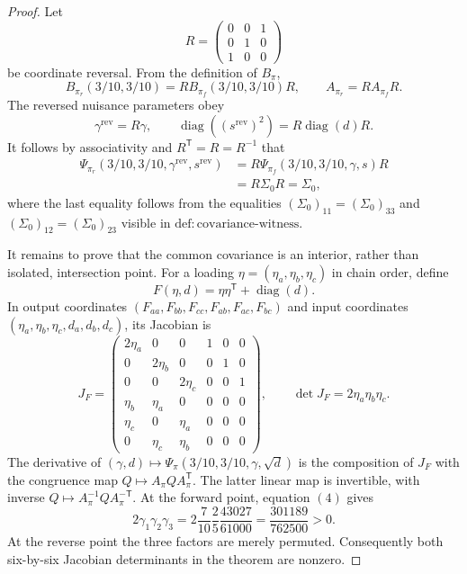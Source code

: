 \documentclass{article}
\begin{document}
\begin{proof}
Let
\[
 R=\begin{pmatrix}0&0&1\\0&1&0\\1&0&0\end{pmatrix}
\]
be coordinate reversal.  From the definition of \(B_\pi\),
\[
 B_{\pi_r}(3/10,3/10)=RB_{\pi_f}(3/10,3/10)R,
 \qquad
 A_{\pi_r}=RA_{\pi_f}R.
\]
The reversed nuisance parameters obey
\[
 \gamma^{\mathrm{rev}}=R\gamma,
 \qquad
 \operatorname{diag}((s^{\mathrm{rev}})^2)
 =R\operatorname{diag}(d)R.
\]
It follows by associativity and \(R^{\mathsf T}=R=R^{-1}\) that
\[
 \begin{aligned}
 \Psi_{\pi_r}(3/10,3/10,\gamma^{\mathrm{rev}},s^{\mathrm{rev}})
 &=R\Psi_{\pi_f}(3/10,3/10,\gamma,s)R\\
 &=R\Sigma_0R
 =\Sigma_0,
 \end{aligned}
 \tag{3}
\]
where the last equality follows from the equalities \((\Sigma_0)_{11}=(\Sigma_0)_{33}\) and \((\Sigma_0)_{12}=(\Sigma_0)_{23}\) visible in \(\mathrm{def{:}covariance\text{-}witness}\).

It remains to prove that the common covariance is an interior, rather than isolated, intersection point.  For a loading \(\eta=(\eta_a,\eta_b,\eta_c)\) in chain order, define
\[
 F(\eta,d)=\eta\eta^{\mathsf T}+\operatorname{diag}(d).
\]
In output coordinates \((F_{aa},F_{bb},F_{cc},F_{ab},F_{ac},F_{bc})\) and input coordinates \((\eta_a,\eta_b,\eta_c,d_a,d_b,d_c)\), its Jacobian is
\[
 J_F=
 \begin{pmatrix}
 2\eta_a&0&0&1&0&0\\
 0&2\eta_b&0&0&1&0\\
 0&0&2\eta_c&0&0&1\\
 \eta_b&\eta_a&0&0&0&0\\
 \eta_c&0&\eta_a&0&0&0\\
 0&\eta_c&\eta_b&0&0&0
 \end{pmatrix},
 \qquad
 \det J_F=2\eta_a\eta_b\eta_c.
 \tag{4}
\]
The derivative of \((\gamma,d)\mapsto\Psi_\pi(3/10,3/10,\gamma,\sqrt d)\) is the composition of \(J_F\) with the congruence map \(Q\mapsto A_\pi Q A_\pi^{\mathsf T}\).  The latter linear map is invertible, with inverse \(Q\mapsto A_\pi^{-1}Q A_\pi^{-\mathsf T}\).  At the forward point, equation \((4)\) gives
\[
 2\gamma_1\gamma_2\gamma_3
 =2\frac7{10}\frac25\frac{43027}{61000}
 =\frac{301189}{762500}>0.
\]
At the reverse point the three factors are merely permuted.  Consequently both six-by-six Jacobian determinants in the theorem are nonzero.


\end{proof}
\end{document}
